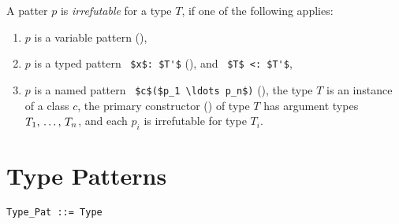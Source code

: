 A patter $p$ is {\em irrefutable} for a type $T$, if one of the following applies: 
\begin{enumerate}
\item $p$ is a variable pattern (),
\item $p$ is a typed pattern ~\lstinline!$x$: $T'$! (), and ~\lstinline!$T$ <: $T'$!,
\item $p$ is a named pattern ~\lstinline!$c$($p_1 \ldots p_n$)! (), the type $T$ is an instance of a class $c$, the primary constructor () of type $T$ has argument types $T_1 ,\, \ldots ,\, T_n$, and each $p_i$ is irrefutable for type $T_i$. 
\end{enumerate}






\section{Type Patterns}
\label{sec:type-patterns}

\syntax\begin{lstlisting}
Type_Pat ::= Type
\end{lstlisting}

